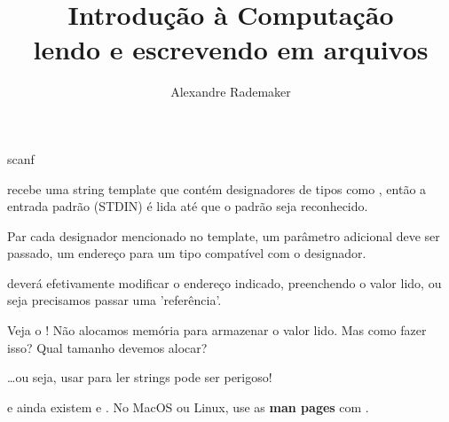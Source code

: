 \documentclass{beamer}
\title{Introdução à Computação \\ lendo e escrevendo em arquivos}
\author{Alexandre Rademaker}
\date{}
\begin{document}
\begin{frame}
 \maketitle
\end{frame}


\begin{frame}{scanf}

   recebe uma string template que contém designadores de
  tipos como , então a entrada padrão (STDIN) é lida até
  que o padrão seja reconhecido.

  Par cada designador mencionado no template, um parâmetro adicional
  deve ser passado, um endereço para um tipo compatível com o
  designador.

   deverá efetivamente modificar o endereço indicado,
  preenchendo o valor lido, ou seja precisamos passar uma
  'referência'.

  \framebreak

  

  Veja o ! Não alocamos memória para armazenar o
  valor lido. Mas como fazer isso? Qual tamanho devemos alocar?

  \framebreak

  

  \ldots ou seja, usar  para ler strings pode ser
  perigoso! 

  \framebreak

  

  e ainda existem  e .  No MacOS ou Linux,
  use as \textbf{man pages} com .

\end{frame}  
\end{document}
